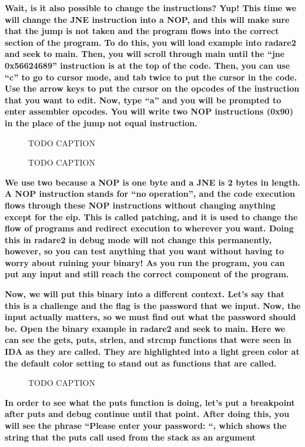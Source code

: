 \documentclass[letterpaper]{article}
\newcommand{\sitfig}[3]{
\begin{figure}[H]
\centering
\makebox[\textwidth][c]{
#2
}
\caption{#3}
\label{#1}
\end{figure}
}
\newcommand{\sitgfx}[4][scale=1.0]{
\sitfig{#3}{\texttt{[image: \#2]}}{#4}
}
\begin{document}
\textbf{Wait, is it also possible to change the instructions? Yup! This time we will change the JNE instruction into a
NOP, and this will make sure that the jump is not taken and the program flows into the correct section of the program.
To do this, you will load example into radare2 and seek to main. Then, you will scroll through main until the ``jne
0x56624689'' instruction is at the top of the code. Then, you can use ``c'' to go to cursor mode, and tab twice to put
the cursor in the code. Use the arrow keys to put the cursor on the opcodes of the instruction that you want to edit.
Now, type ``a'' and you will be prompted to enter assembler opcodes.  You will write two NOP instructions (0x90) in the
place of the jump not equal instruction.}

  
\sitgfx[width=6.5in,height=4.0626in]{FINALWORKINGDOCFORMERLYPRECURSOR-img056.png}{fig:unk}{TODO CAPTION}
 

  
\sitgfx[width=6.5in,height=4.0626in]{FINALWORKINGDOCFORMERLYPRECURSOR-img057.png}{fig:unk}{TODO CAPTION}
 

\textbf{We use two because a NOP is one byte and a JNE is 2 bytes in length. A NOP instruction stands for ``no
operation'', and the code execution flows through these NOP instructions without changing anything except for the eip.
This is called patching, and it is used to change the flow of programs and redirect execution to wherever you want.
Doing this in radare2 in debug mode will not change this permanently, however, so you can test anything that you want
without having to worry about ruining your binary! As you run the program, you can put any input and still reach the
correct component of the program.}

\textbf{Now, we will put this binary into a different context. Let's say that this is a challenge and the flag is the
password that we input. Now, the input actually matters, so we must find out what the password should be. Open the
binary example in radare2 and seek to main. Here we can see the gets, puts, strlen, and strcmp functions that were seen
in IDA as they are called. They are highlighted into a light green color at the default color setting to stand out as
functions that are called.}

  
\sitgfx[width=6.5in,height=4.0626in]{FINALWORKINGDOCFORMERLYPRECURSOR-img053.png}{fig:unk}{TODO CAPTION}
 

\textbf{In order to see what the puts function is doing, let's put a breakpoint after puts and debug continue until that
point. After doing this, you will see the phrase ``Please enter your password: ``, which shows the string that the puts
call used from the stack as an argument}
\end{document}
